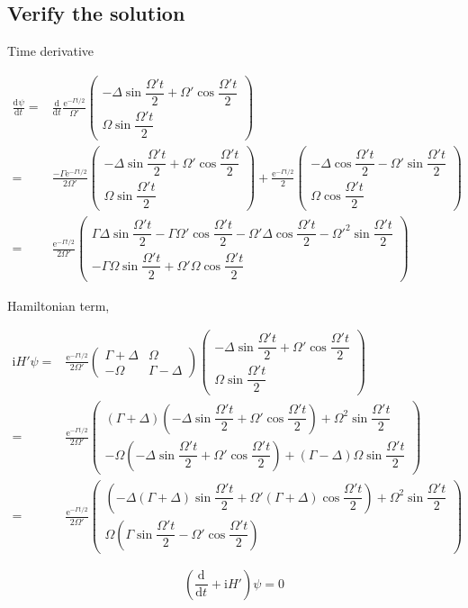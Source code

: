 \documentclass[10pt,fleqn]{article}
\newcommand{\ud}{\mathrm{d}}
\newcommand{\ue}{\mathrm{e}}
\newcommand{\ui}{\mathrm{i}}
\newcommand{\eqar}[1]
{
  \begin{align*}
    #1
  \end{align*}
}
\newcommand{\paren}[1]{{\left({#1}\right)}}
\newcommand{\diff}[3][{}]{{\frac{\ud^{#1} {#2}}{\ud {#3}{}^{#1}}}}
\begin{document}
\subsection{Verify the solution}
Time derivative
\eqar{
  \diff{\psi}{t}=&\diff{}{t}\frac{\ue^{-\Gamma t/2}}{\Omega'}\begin{pmatrix}
    -\Delta\sin\dfrac{\Omega't}{2}+\Omega'\cos\dfrac{\Omega't}{2}\\
    \Omega\sin\dfrac{\Omega't}{2}
  \end{pmatrix}\\
  =&\frac{-\Gamma\ue^{-\Gamma t/2}}{2\Omega'}\begin{pmatrix}
    -\Delta\sin\dfrac{\Omega't}{2}+\Omega'\cos\dfrac{\Omega't}{2}\\
    \Omega\sin\dfrac{\Omega't}{2}
  \end{pmatrix}+\frac{\ue^{-\Gamma t/2}}{2}\begin{pmatrix}
    -\Delta\cos\dfrac{\Omega't}{2}-\Omega'\sin\dfrac{\Omega't}{2}\\
    \Omega\cos\dfrac{\Omega't}{2}
  \end{pmatrix}\\
  =&\frac{\ue^{-\Gamma t/2}}{2\Omega'}\begin{pmatrix}
    \Gamma\Delta\sin\dfrac{\Omega't}{2}-\Gamma\Omega'\cos\dfrac{\Omega't}{2}-\Omega'\Delta\cos\dfrac{\Omega't}{2}-\Omega'^2\sin\dfrac{\Omega't}{2}\\
    -\Gamma\Omega\sin\dfrac{\Omega't}{2}+\Omega'\Omega\cos\dfrac{\Omega't}{2}
  \end{pmatrix}
}
Hamiltonian term,
\eqar{
  \ui H'\psi=&\frac{\ue^{-\Gamma t/2}}{2\Omega'}\begin{pmatrix}
    \Gamma+\Delta&\Omega\\
    -\Omega&\Gamma-\Delta
  \end{pmatrix}\begin{pmatrix}
    -\Delta\sin\dfrac{\Omega't}{2}+\Omega'\cos\dfrac{\Omega't}{2}\\
    \Omega\sin\dfrac{\Omega't}{2}
  \end{pmatrix}\\
  =&\frac{\ue^{-\Gamma t/2}}{2\Omega'}\begin{pmatrix}
    \paren{\Gamma+\Delta}\paren{-\Delta\sin\dfrac{\Omega't}{2}+\Omega'\cos\dfrac{\Omega't}{2}}+\Omega^2\sin\dfrac{\Omega't}{2}\\
    -\Omega\paren{-\Delta\sin\dfrac{\Omega't}{2}+\Omega'\cos\dfrac{\Omega't}{2}}+\paren{\Gamma-\Delta}\Omega\sin\dfrac{\Omega't}{2}
  \end{pmatrix}\\
  =&\frac{\ue^{-\Gamma t/2}}{2\Omega'}\begin{pmatrix}
    \paren{-\Delta\paren{\Gamma+\Delta}\sin\dfrac{\Omega't}{2}+\Omega'\paren{\Gamma+\Delta}\cos\dfrac{\Omega't}{2}}+\Omega^2\sin\dfrac{\Omega't}{2}\\
    \Omega\paren{\Gamma\sin\dfrac{\Omega't}{2}-\Omega'\cos\dfrac{\Omega't}{2}}
  \end{pmatrix}
}
\[\paren{\diff{}{t}+\ui H'}\psi=0\]
\end{document}
